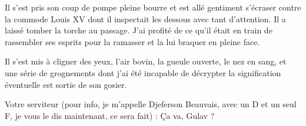 Il s’est pris son coup de pompe pleine bourre et est allé gentiment s’écraser contre la commode Louis XV dont il inspectait les dessous avec tant d’attention. Il a laissé tomber la torche au passage. J’ai profité de ce qu’il était en train de rassembler ses esprits pour la ramasser et la lui braquer en pleine face.

Il s’est mis à cligner des yeux, l’air bovin, la gueule ouverte, le nez en sang, et une série de grognements dont j’ai été incapable de décrypter la signification éventuelle est sortie de son gosier.

%

Votre serviteur (pour info, je m’appelle Djeferson Beauvais, avec un D et un seul F, je vous le dis maintenant, ce sera fait) : Ça va, Gulav ?


